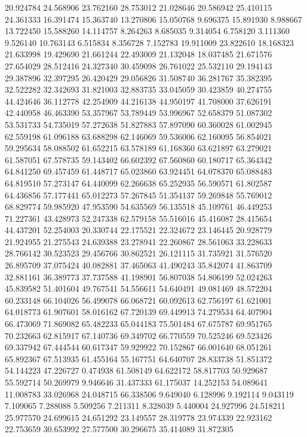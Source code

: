 20.924784
24.568906
23.762160
28.753012
21.028646
20.586942
25.410115
24.361333
16.391474
15.363740
13.270806
15.050768
9.696375
15.891930
8.988667
13.722450
15.588260
14.114757
8.264263
8.685035
9.314054
6.758120
3.111360
9.526140
10.763143
6.515834
8.356728
7.152783
19.911009
23.822610
18.168323
21.633998
19.429690
21.661244
22.493009
21.132048
18.037485
21.671576
27.654029
28.512416
24.327340
30.459098
26.761022
25.532110
29.194143
29.387896
32.397295
26.420429
29.056826
31.508740
36.281767
35.382395
32.522282
32.342693
31.821003
32.883735
33.045059
30.423859
40.274755
44.424646
36.112778
42.254909
44.216138
44.950197
41.708000
37.626191
42.440958
46.463390
53.357967
53.789449
53.996967
52.658379
51.087302
53.531733
54.735019
57.272638
51.827883
57.897090
60.360028
61.002945
62.559198
61.096188
63.688298
62.146069
59.536006
62.160095
56.854021
59.295634
58.088502
61.652215
63.578189
61.168360
63.621897
63.279021
61.587051
67.578735
59.143402
66.602392
67.560860
60.180717
65.364342
64.841250
69.457459
61.448717
65.023860
63.924451
64.078370
65.088483
64.819510
57.273147
64.440099
62.266638
65.252935
56.590571
61.802587
64.436856
57.177441
65.012273
57.267845
51.354137
59.269848
55.769012
68.829774
59.985920
47.953590
54.635569
56.135518
45.109761
46.449253
71.227361
43.428973
52.247338
62.579158
55.516016
45.416087
28.415654
44.437201
52.254003
20.330744
22.175521
22.324672
23.146445
20.928779
21.924955
21.275543
24.639388
23.278941
22.260867
28.561063
33.228633
28.766142
30.523523
29.456766
30.862521
26.121115
31.735921
31.576520
26.895709
37.075424
40.082881
37.465063
41.490243
35.842074
41.863709
32.881161
36.389773
37.737588
41.198901
56.807038
54.806199
52.024263
45.839582
51.401604
49.767541
54.556611
54.640491
49.081469
48.572204
60.233148
66.104026
56.499078
66.068721
60.092613
62.756197
61.621001
64.018773
61.907601
58.016162
67.720139
69.449913
74.279534
64.407904
66.473069
71.869082
65.482233
65.044183
75.501484
67.675787
69.951765
70.232663
62.815917
67.140736
69.349702
66.770559
70.525246
69.523426
69.337942
67.444544
60.617347
59.929922
70.152867
66.001640
68.051261
65.892367
67.513935
61.455164
55.167751
64.640707
28.833738
51.851372
54.144223
47.226727
0.474938
61.508149
64.622172
58.817703
50.929687
55.592714
50.269979
9.946646
31.437333
61.175037
14.252153
54.089641
11.008783
33.026968
24.048715
66.338506
9.649040
6.128996
9.192114
9.043119
7.109065
7.288088
5.509256
7.211311
8.328039
5.440004
24.927996
24.518211
25.977570
24.699615
24.651292
23.149557
28.319778
23.974339
22.923162
22.753659
30.653992
27.577500
30.296675
35.414089
31.872305
